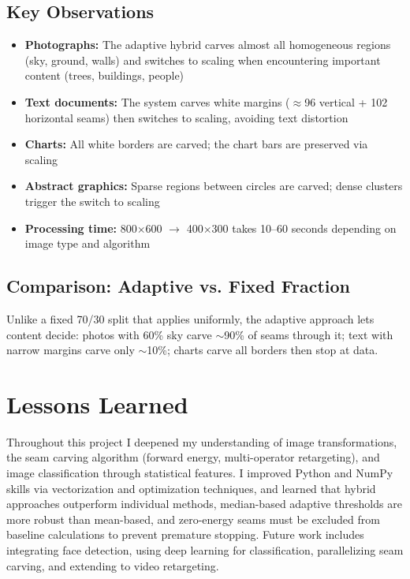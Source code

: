 \documentclass[12pt,a4paper]{article}
\begin{document}
\subsection{Key Observations}

\begin{itemize}
    \item \textbf{Photographs:} The adaptive hybrid carves almost all homogeneous regions (sky, ground, walls) and switches to scaling when encountering important content (trees, buildings, people)
    \item \textbf{Text documents:} The system carves white margins ($\approx$96 vertical + 102 horizontal seams) then switches to scaling, avoiding text distortion
    \item \textbf{Charts:} All white borders are carved; the chart bars are preserved via scaling
    \item \textbf{Abstract graphics:} Sparse regions between circles are carved; dense clusters trigger the switch to scaling
    \item \textbf{Processing time:} 800$\times$600 $\rightarrow$ 400$\times$300 takes 10--60 seconds depending on image type and algorithm
\end{itemize}

\subsection{Comparison: Adaptive vs. Fixed Fraction}

Unlike a fixed 70/30 split that applies uniformly, the adaptive approach lets content decide: photos with 60\% sky carve $\sim$90\% of seams through it; text with narrow margins carve only $\sim$10\%; charts carve all borders then stop at data.

\section{Lessons Learned}

Throughout this project I deepened my understanding of image transformations, the seam carving algorithm (forward energy, multi-operator retargeting), and image classification through statistical features. I improved Python and NumPy skills via vectorization and optimization techniques, and learned that hybrid approaches outperform individual methods, median-based adaptive thresholds are more robust than mean-based, and zero-energy seams must be excluded from baseline calculations to prevent premature stopping. Future work includes integrating face detection, using deep learning for classification, parallelizing seam carving, and extending to video retargeting.
\end{document}
